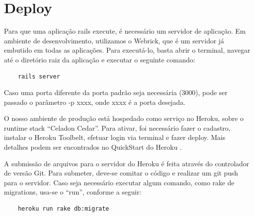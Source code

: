      
     
    \section{Deploy}
            Para que uma aplicação rails execute, é necessário um servidor de aplicação. Em ambiente de desenvolvimento, utilizamos o Webrick, que é um servidor já embutido em todas as aplicações. Para executá-lo, basta abrir o terminal, navegar até o diretório raiz da aplicação e executar o seguinte comando:
			
	\begin{lstlisting}		
    rails server
     \end{lstlisting}
	 
            Caso uma porta diferente da porta padrão seja necessária (3000), pode ser passado o parâmetro -p xxxx, onde xxxx é a porta desejada.
			
            O nosso ambiente de produção está hospedado como serviço no Heroku, sobre o runtime stack ``Celadon Cedar''. Para ativar, foi necessário fazer o cadastro, instalar o Heroku Toolbelt, efetuar login via terminal e fazer deploy. Mais detalhes podem ser encontrados no QuickStart do Heroku \cite{quickheroku}.
			
            A submissão de arquivos para o servidor do Heroku é feita através do controlador de versão Git. Para submeter, deve-se comitar o código e realizar um git push para o servidor. Caso seja necessário executar algum comando, como rake de migrations, usa-se o ``run'', conforme a seguir:
			
\begin{lstlisting}	
    heroku run rake db:migrate 
\end{lstlisting}